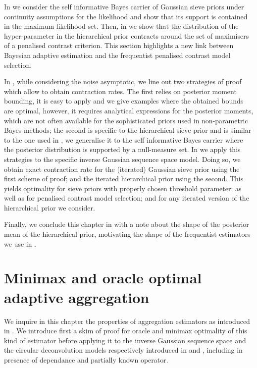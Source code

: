 \documentclass[a4paper,11pt]{book}
\begin{document}
In  we consider the self informative Bayes carrier of Gaussian sieve priors under continuity assumptions for the likelihood and show that its support is contained in the maximum likelihood set.
Then, in  we show that the distribution of the hyper-parameter in the hierarchical prior contracts around the set of maximisers of a penalised contrast criterion.
This section highlights a new link between Bayesian adaptive estimation and the frequentist penalised contrast model selection.

In , while considering the noise asymptotic, we line out two strategies of proof which allow to obtain contraction rates. The first relies on posterior moment bounding, it is easy to apply and we give examples where the obtained bounds are optimal, however, it requires analytical expressions for the posterior moments, which are not often available for the sophisticated priors used in non-parametric Bayes methods; the second is specific to the hierarchical sieve prior and is similar to the one used in , we generalise it to the self informative Bayes carrier where the posterior distribution is supported by a null-measure set.
In  we apply this strategies to the specific inverse Gaussian sequence space model.
Doing so, we obtain exact contraction rate for the (iterated) Gaussian sieve prior using the first scheme of proof; and the iterated hierarchical prior using the second.
This yields optimality for sieve priors with properly chosen threshold parameter; as well as for penalised contrast model selection; and for any iterated version of the hierarchical prior we consider.

Finally, we conclude this chapter in  with a note about the shape of the posterior mean of the hierarchical prior, motivating the shape of the frequentist estimators we use in .





%

\chapter{Minimax and oracle optimal adaptive aggregation}\label{FREQ}
We inquire in this chapter the properties of aggregation estimators as introduced in .
We introduce first a skim of proof for oracle and minimax optimality of this kind of estimator before applying it to the inverse Gaussian sequence space and the circular deconvolution models respectively introduced in  and , including in presence of dependance and partially known operator.
\end{document}
